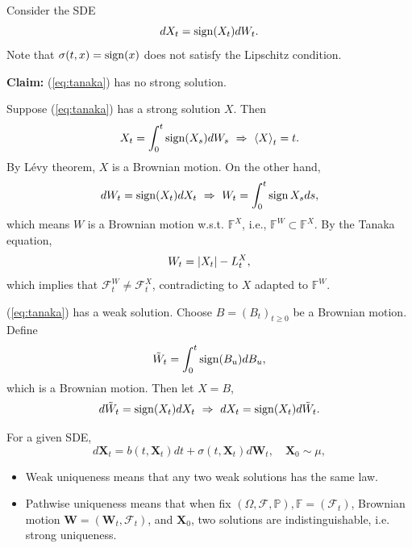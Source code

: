 \begin{exam}
    Consider the SDE
    \begin{equation*}\label{eq:tanaka}
        dX_t = \operatorname{sign}(X_t)dW_t.
    \end{equation*}
    Note that $\sigma(t,x) = \operatorname{sign}(x)$ does not satisfy the Lipschitz condition.

    \noindent \textbf{Claim:} (\ref{eq:tanaka}) has no strong solution.

    \noindent Suppose (\ref{eq:tanaka}) has a strong solution $X$. Then
    \begin{equation*}
        X_t = \int_0^t \operatorname{sign}(X_s)dW_s~\Rightarrow~ \left\langle X \right\rangle_t = t.
    \end{equation*}
    By L\'evy theorem, $X$ is a Brownian motion. On the other hand,
    \begin{equation*}
        dW_t = \operatorname{sign}(X_t)dX_t~\Rightarrow~ W_t = \int_0^t \operatorname{sign}{X_s}ds,
    \end{equation*}
    which means $W$ is a Brownian motion w.s.t. $\mathbb{F}^X$, i.e., $\mathbb{F}^W \subset \mathbb{F}^X$. By the Tanaka equation,
    \begin{equation*}
        W_t = \left\lvert X_t\right\lvert - L^X_t,
    \end{equation*}
    which implies that $\mathcal{F}^W_t \neq \mathcal{F}^X_t$, contradicting to $X$ adapted to $\mathbb{F}^W$.

    \noindent (\ref{eq:tanaka}) has a weak solution. Choose $B = (B_t)_{t \geq 0}$ be a Brownian motion. Define
    \begin{equation*}
        \tilde{W}_t = \int_0^t\operatorname{sign}(B_u)dB_u,
    \end{equation*}
    which is a Brownian motion. Then let $X=B$,
    \begin{equation*}
        d\tilde{W}_t = \operatorname{sign}(X_t)dX_t~\Rightarrow~dX_t = \operatorname{sign}(X_t)d\tilde{W}_t.
    \end{equation*}
\end{exam}

\begin{defn}
    For a given SDE,
    \begin{equation*}
        d\bm{X}_t = b(t,\bm{X}_t)dt+\sigma(t,\bm{X}_t)d\bm{W}_t, \quad \bm{X}_0 \sim \mu,
    \end{equation*}
    \begin{itemize}
        \item Weak uniqueness means that any two weak solutions has the same law.
        \item Pathwise uniqueness means that when fix $(\Omega,\mathcal{F},\mathbb{P}), \mathbb{F}=(\mathcal{F}_t)$, Brownian motion $\bm{W} = (\bm{W}_t,\mathcal{F}_t)$, and $\bm{X}_0$, two solutions are indistinguishable, i.e. strong uniqueness.
    \end{itemize}
\end{defn}

